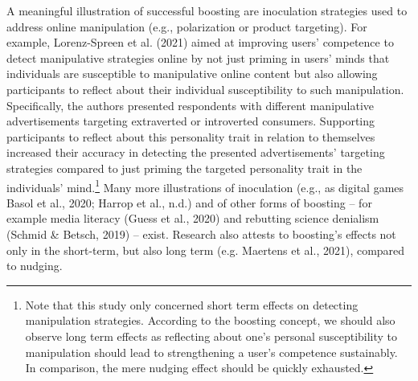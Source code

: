 \documentclass[reflection, authordate,issue]{jote-new-article}
\begin{document}
A meaningful illustration of successful boosting are inoculation strategies used to address online manipulation (e.g., polarization or product targeting). For example, Lorenz-Spreen et al. (2021) aimed at improving users’ competence to detect manipulative strategies online by not just priming in users’ minds that individuals are susceptible to manipulative online content but also allowing participants to reflect about their individual susceptibility to such manipulation. Specifically, the authors presented respondents with different manipulative advertisements targeting extraverted or introverted consumers. Supporting participants to reflect about this personality trait in relation to themselves increased their accuracy in detecting the presented advertisements’ targeting strategies compared to just priming the targeted personality trait in the individuals’ mind.\footnote{ Note that this study only concerned short term effects on detecting manipulation strategies. According to the boosting concept, we should also observe long term effects as reflecting about one’s personal susceptibility to manipulation should lead to strengthening a user’s competence sustainably. In comparison, the mere nudging effect should be quickly exhausted.} Many more illustrations of inoculation (e.g., as digital games Basol et al., 2020; Harrop et al., n.d.) and of other forms of boosting – for example media literacy  (Guess et al., 2020) and rebutting science denialism (Schmid \& Betsch, 2019) – exist. Research also attests to boosting’s effects not only in the short-term, but also long term (e.g. Maertens et al., 2021), compared to nudging.
\end{document}
